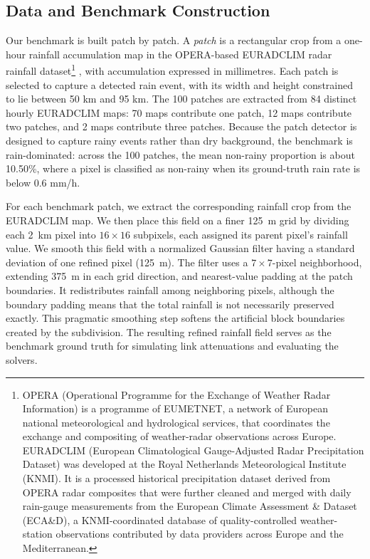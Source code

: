 \documentclass[11pt]{article}
\begin{document}
\subsection{Data and Benchmark Construction}
Our benchmark is built patch by patch. A \emph{patch} is {\color{black}a rectangular crop from a one-hour rainfall accumulation map in the OPERA-based EURADCLIM radar rainfall dataset}\footnote{OPERA (Operational Programme for the Exchange of Weather Radar Information) is a programme of EUMETNET, a network of European national meteorological and hydrological services, that coordinates the exchange and compositing of weather-radar observations across Europe. EURADCLIM (European Climatological Gauge-Adjusted Radar Precipitation Dataset) was developed at the Royal Netherlands Meteorological Institute (KNMI). It is a processed historical precipitation dataset derived from OPERA radar composites that were further cleaned and merged with daily rain-gauge measurements from the European Climate Assessment \& Dataset (ECA\&D), a KNMI-coordinated database of quality-controlled weather-station observations contributed by data providers across Europe and the Mediterranean.} \citep{overeem2025euradclim}{\color{black}, with accumulation expressed in millimetres.} Each patch is selected to capture a detected rain event, with its width and height constrained to lie between 50 km and 95 km. The 100 patches are extracted from 84 distinct hourly EURADCLIM maps: 70 maps contribute one patch, 12 maps contribute two patches, and 2 maps contribute three patches. Because the patch detector is designed to capture rainy events rather than dry background, the benchmark is rain-dominated: across the 100 patches, the mean non-rainy proportion is about 10.50\%, where a pixel is classified as non-rainy when its ground-truth rain rate is below 0.6 mm/h.

For each benchmark patch, we extract the corresponding rainfall crop from the EURADCLIM map. We then place this field on a finer \SI{125}{m} grid by dividing each \SI{2}{km} pixel into $16\times16$ subpixels, each assigned its parent pixel's rainfall value. We smooth this field with a normalized Gaussian filter having a standard deviation of one refined pixel (\SI{125}{m}). The filter uses a $7\times7$-pixel neighborhood, extending \SI{375}{m} in each grid direction, and nearest-value padding at the patch boundaries. It redistributes rainfall among neighboring pixels, although the boundary padding means that the total rainfall is not necessarily preserved exactly. This pragmatic smoothing step softens the artificial block boundaries created by the subdivision. The resulting refined rainfall field serves as the benchmark ground truth for simulating link attenuations and evaluating the solvers.
\end{document}
